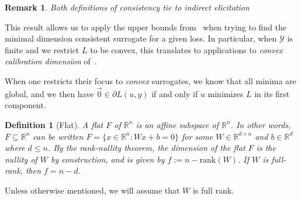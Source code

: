 \documentclass{article}
\newcommand{\Comments}{1}
\newcommand{\mytodo}[2]{\ifnum\Comments=1%
	\todo[linecolor=#1!80!black,backgroundcolor=#1,bordercolor=#1!80!black]{#2}\fi}
\newcommand{\raft}[1]{\mytodo{green!20!white}{RF: #1}}
\newcommand{\reals}{\mathbb{R}}
\newcommand{\simplex}{\Delta_\Y}
\newcommand{\Y}{\mathcal{Y}}
\newcommand{\inprod}[2]{\langle #1, #2 \rangle}
\newtheorem{theorem}{Theorem}
\newtheorem{corollary}{Corollary}
\newtheorem{definition}{Definition}
\newtheorem{remark}{Remark}
\DeclareMathOperator*{\arginf}{arg\,inf}
\begin{document}
\begin{remark}
	Both definitions of consistency tie to indirect elicitation
\end{remark}

This result allows us to apply the upper bounds from~\cite{frongillo2015elicitation} when trying to find the minimal dimension consistent surrogate for a given loss.
In particular, when $\Y$ is finite and we restrict $L$ to be convex, this translates to applications to \emph{convex calibration dimension} of~\cite{ramaswamy2016convex}.


When one restricts their focus to \emph{convex} surrogates, we know that all minima are global, and we then have $\vec 0  \in \partial L(u, y)$ if and only if $u$ minimizes $L$ in its first component.

%

\begin{definition}[Flat]
	A \emph{flat} $F$ of $\reals^n$ is an affine subspace of $\reals^n$.
	In other words, $F\subseteq \reals^n$ can be written $F=\{x\in\reals^n : Wx + b = 0\}$ for some $W\in\reals^{d\times n}$ and $b\in\reals^d$ where $d\leq n$.
	By the rank-nullity theorem, the dimension of the flat $F$ is the nullity of $W$ by construction, and is given by $f := n - \mathrm{rank}(W)$.
	If $W$ is full-rank, then $f = n - d$.
\end{definition}
Unless otherwise mentioned, we will assume that $W$ is full rank.
\end{document}
